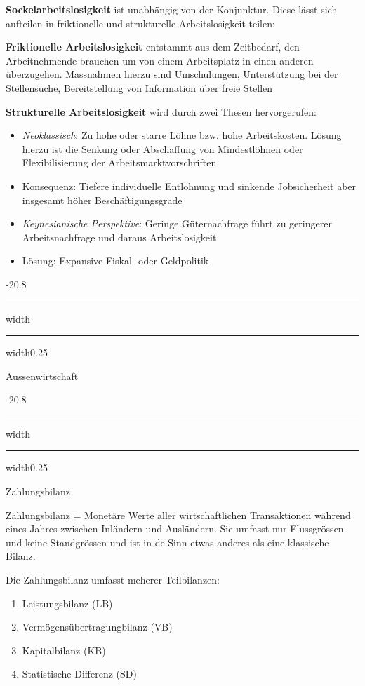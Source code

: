 \documentclass[9pt, landscape, fleqn]{scrartcl}
\makeatletter
\renewcommand{\section}{\@startsection{section}{1}{0mm}%
{-2\baselineskip}{0.8\baselineskip}%
{\hrule depth 0.2pt width\columnwidth\hrule depth1.5pt
width0.25\columnwidth\vspace*{1.2em}\Large\bfseries\rmfamily}}
\renewcommand{\subsection}{\@startsection{subsection}{1}{0mm}%
{-2\baselineskip}{0.8\baselineskip}%
{\hrule depth 0.2pt width\columnwidth\hrule depth0.75pt
width0.25\columnwidth\vspace*{1.2em}\large\bfseries\rmfamily}}
\makeatother
\begin{document}
\begin{multicols*}{3}
\textbf{Sockelarbeitslosigkeit} ist unabhängig von der Konjunktur. Diese lässt sich aufteilen in friktionelle und strukturelle Arbeitslosigkeit teilen:  \newline

\textbf{Friktionelle Arbeitslosigkeit} entstammt aus dem Zeitbedarf, den Arbeitnehmende brauchen um von einem Arbeitsplatz in einen anderen überzugehen. Massnahmen hierzu sind Umschulungen, Unterstützung bei der Stellensuche, Bereitstellung von Information über freie Stellen \newline

\textbf{Strukturelle Arbeitslosigkeit} wird durch zwei Thesen hervorgerufen: 

\begin{itemize}
    \item \emph{Neoklassisch}: Zu hohe oder starre Löhne bzw. hohe Arbeitskosten. Lösung hierzu ist die Senkung oder Abschaffung von Mindestlöhnen oder Flexibilisierung der Arbeitsmarktvorschriften
    \item Konsequenz: Tiefere individuelle Entlohnung und sinkende Jobsicherheit aber insgesamt höher Beschäftigungsgrade 
    \item \emph{Keynesianische Perspektive}: Geringe Güternachfrage führt zu geringerer Arbeitsnachfrage und daraus Arbeitslosigkeit 
    \item Lösung: Expansive Fiskal- oder Geldpolitik
\end{itemize}

\section{Aussenwirtschaft}

\subsection{Zahlungsbilanz}

Zahlungsbilanz = Monetäre Werte aller wirtschaftlichen Transaktionen während eines Jahres zwischen Inländern und Ausländern. Sie umfasst nur Flussgrössen und keine Standgrössen und ist in de Sinn etwas anderes als eine klassische Bilanz. 

Die Zahlungsbilanz umfasst meherer Teilbilanzen: 

\begin{enumerate}
    \item Leistungsbilanz (LB)
    \item Vermögensübertragungbilanz (VB)
    \item Kapitalbilanz (KB)
    \item Statistische Differenz (SD)
\end{enumerate}


\end{multicols*}
\end{document}
